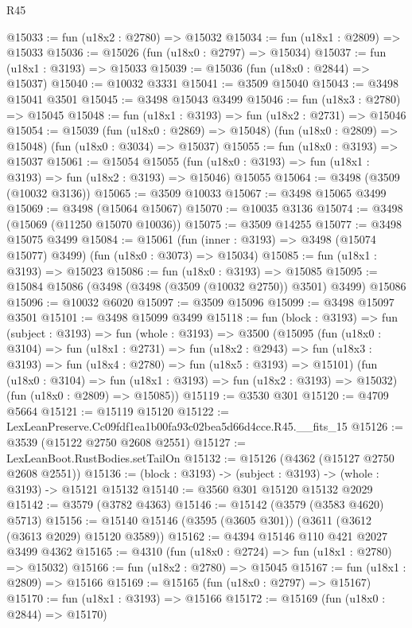 \begin{lexlean}{R45}
\begin{coremodule}
@15033 := fun (u18x2 : @2780) => @15032
@15034 := fun (u18x1 : @2809) => @15033
@15036 := @15026 (fun (u18x0 : @2797) => @15034)
@15037 := fun (u18x1 : @3193) => @15033
@15039 := @15036 (fun (u18x0 : @2844) => @15037)
@15040 := @10032 @3331
@15041 := @3509 @15040
@15043 := @3498 @15041 @3501
@15045 := @3498 @15043 @3499
@15046 := fun (u18x3 : @2780) => @15045
@15048 := fun (u18x1 : @3193) => fun (u18x2 : @2731) => @15046
@15054 := @15039
    (fun (u18x0 : @2869) => @15048)
    (fun (u18x0 : @2809) => @15048)
    (fun (u18x0 : @3034) => @15037)
@15055 := fun (u18x0 : @3193) => @15037
@15061 := @15054
    @15055
    (fun (u18x0 : @3193) => fun (u18x1 : @3193) => fun (u18x2 : @3193) => @15046)
    @15055
@15064 := @3498 (@3509 (@10032 @3136))
@15065 := @3509 @10033
@15067 := @3498 @15065 @3499
@15069 := @3498 (@15064 @15067)
@15070 := @10035 @3136
@15074 := @3498 (@15069 (@11250 @15070 @10036))
@15075 := @3509 @14255
@15077 := @3498 @15075 @3499
@15084 := @15061
    (fun (inner : @3193) => @3498 (@15074 @15077) @3499)
    (fun (u18x0 : @3073) => @15034)
@15085 := fun (u18x1 : @3193) => @15023
@15086 := fun (u18x0 : @3193) => @15085
@15095 := @15084 @15086 (@3498 (@3498 (@3509 (@10032 @2750)) @3501) @3499) @15086
@15096 := @10032 @6020
@15097 := @3509 @15096
@15099 := @3498 @15097 @3501
@15101 := @3498 @15099 @3499
@15118 := fun (block : @3193) =>
  fun (subject : @3193) =>
  fun (whole : @3193) =>
  @3500
    (@15095
      (fun (u18x0 : @3104) =>
      fun (u18x1 : @2731) =>
      fun (u18x2 : @2943) =>
      fun (u18x3 : @3193) => fun (u18x4 : @2780) => fun (u18x5 : @3193) => @15101)
      (fun (u18x0 : @3104) => fun (u18x1 : @3193) => fun (u18x2 : @3193) => @15032)
      (fun (u18x0 : @2809) => @15085))
@15119 := @3530 @301
@15120 := @4709 @5664
@15121 := @15119 @15120
@15122 := LexLeanPreserve.Cc09fdf1ea1b00fa93c02bea5d66d4cce.R45.__fits_15
@15126 := @3539 (@15122 @2750 @2608 @2551)
@15127 := LexLeanBoot.RustBodies.setTailOn
@15132 := @15126 (@4362 (@15127 @2750 @2608 @2551))
@15136 := (block : @3193) -> (subject : @3193) -> (whole : @3193) -> @15121 @15132
@15140 := @3560 @301 @15120 @15132 @2029
@15142 := @3579 (@3782 @4363)
@15146 := @15142 (@3579 (@3583 @4620) @5713)
@15156 := @15140 @15146 (@3595 (@3605 @301)) (@3611 (@3612 (@3613 @2029) @15120 @3589))
@15162 := @4394 @15146 @110 @421 @2027 @3499 @4362
@15165 := @4310 (fun (u18x0 : @2724) => fun (u18x1 : @2780) => @15032)
@15166 := fun (u18x2 : @2780) => @15045
@15167 := fun (u18x1 : @2809) => @15166
@15169 := @15165 (fun (u18x0 : @2797) => @15167)
@15170 := fun (u18x1 : @3193) => @15166
@15172 := @15169 (fun (u18x0 : @2844) => @15170)

\end{coremodule}
\end{lexlean}
